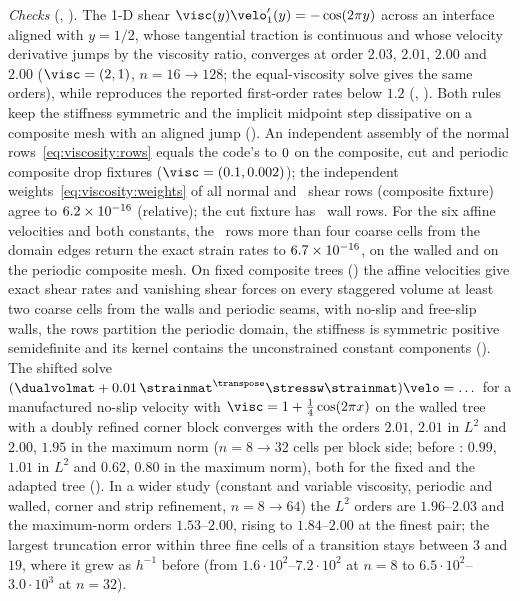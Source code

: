

\emph{Checks} (, ).
The 1-D shear $\visc(y)\velo_1'(y)=-\cos(2\pi y)$ across an interface aligned
with $y=1/2$, whose tangential traction is continuous and whose velocity
derivative jumps by the viscosity ratio, converges at order $2.03$, $2.01$,
$2.00$ and $2.00$ ($\visc=(2,1)$, $n=16\to128$; the equal-viscosity solve gives
the same orders), while  reproduces the
reported first-order rates below $1.2$
(,
).
Both rules keep the stiffness symmetric and the implicit midpoint step
dissipative on a composite mesh with an aligned jump
(). An
independent assembly of the normal rows~\cref{eq:viscosity:rows} equals the
code's to $0$ on the composite, cut and periodic composite
drop fixtures ($\visc=(0.1,0.002)$); the independent
weights~\cref{eq:viscosity:weights} of all normal and \chkViscShearRows\
shear rows (composite fixture) agree to $6.2\times10^{-16}$ (relative); the
cut fixture has \chkViscWallRows\ wall rows. For the six affine velocities
and both constants, the \chkViscAffineRows\ rows more than four coarse cells
from the domain edges return the exact strain rates to $6.7\times10^{-16}$,
on the walled and on the periodic composite mesh.
On fixed composite trees () the affine velocities give exact shear
rates and vanishing shear forces on every staggered volume at least two coarse
cells from the walls and periodic seams, with no-slip and free-slip walls,
the rows partition the periodic domain, the stiffness is symmetric positive
semidefinite and its kernel contains the unconstrained constant components
().
The shifted solve $(\dualvolmat+0.01\,\strainmat^{\transpose}\stressw\strainmat)\velo=\dots$
for a manufactured no-slip velocity with $\visc=1+\tfrac14\cos(2\pi x)$ on the
walled tree with a doubly refined corner block converges with the orders
$2.01$, $2.01$ in $L^2$ and $2.00$, $1.95$ in the maximum norm ($n=8\to32$
cells per block side; before \issue{112}: $0.99$, $1.01$ in $L^2$ and $0.62$,
$0.80$ in the maximum norm), both for the fixed and the adapted tree
().
In a wider study (constant and variable viscosity, periodic and walled,
corner and strip refinement, $n=8\to64$) the $L^2$ orders are $1.96$--$2.03$
and the maximum-norm orders $1.53$--$2.00$, rising to $1.84$--$2.00$ at the
finest pair; the largest truncation error within three fine cells of a
transition stays between $3$ and $19$, where it grew as $h^{-1}$ before
(from $1.6\cdot10^2$--$7.2\cdot10^2$ at $n=8$ to $6.5\cdot10^2$--$3.0\cdot10^3$
at $n=32$).

